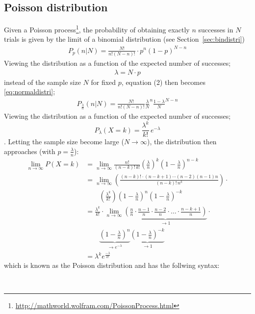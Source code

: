 \documentclass[fontsize=11pt,english,BCOR=10mm,DIV=12,bibliography=totoc,parskip=false,headings=small,
    headinclude=false,footinclude=false,oneside]{pst-doc}
\begin{document}
\clearpage
\subsection{Poisson distribution}
Given a Poisson process\footnote{\url{http://mathworld.wolfram.com/PoissonProcess.html}}, 
the probability of obtaining exactly $n$ successes in $N$ trials is given by the 
limit of a binomial distribution (see Section~\ref{sec:bindistri})
%
\begin{align}
P_p(n|N) = \frac{N!}{n!(N-n)!}\cdot p^n(1-p)^{N-n}\label{eq:normaldistri}
\end{align}
%
Viewing the distribution as a function of the expected number of successes;
%	
\begin{align}\label{eq:nu}
\lambda = N\cdot p
\end{align}
%
instead of the sample size $N$ for fixed $p$, equation (2) then becomes
\eqref{eq:normaldistri};
%	
\begin{align}\label{eq:nuN}
P_{\frac{\lambda}{n}}(n|N) = \frac{N!}{n!(N-n)!}{\frac{\lambda}{N}}^n {\frac{1-\lambda}{N}}^{N-n}
\end{align}
%
Viewing the distribution as a function of the expected number of successes;
%
\[ P_\lambda(X=k)=\frac{\lambda^k}{k!}\,e^{-\lambda} \].
%
Letting the sample size become large ($N\to\infty$), the distribution then 
approaches (with $p=\frac{\lambda}{n}$):
%
\begin{align}
\lim_{n\to\infty} P(X=k) &= \lim_{n\to\infty}\frac{n!}{(n-k)!\,k!}
	 \left(\frac{\lambda}{n}\right)^k \left(1-\frac{\lambda}{n}\right)^{n-k} \\
  &= \lim_{n\to\infty} \left(\frac{(n-k)!\cdot (n-k+1)\cdots(n-2)(n-1)n}{(n-k)!\,n^k}\right)\cdot\\
  &\qquad \left(\frac{\lambda^k}{k!}\right)\left(1-\frac{\lambda}{n}\right)^n 
	\left(1-\frac{\lambda}{n}\right)^{-k}\\
  &= \frac{\lambda^k}{k!}\cdot \lim_{n\to\infty}
     \underbrace{\left(\frac{n}{n}\cdot \frac{n-1}{n}\cdot\frac{n-2}{n}\cdot\ldots\cdot 
    	\frac{n-k+1}{n}\right)}_{\to 1} \cdot\\
  &\qquad   \underbrace{\left(1-\frac{\lambda}{n}\right)^n}_{\to{e^{-\lambda}}}  
     \underbrace{\left(1-\frac{\lambda}{n}\right)^{-k}}_{\to 1}\\
  &=  \lambda^k e^{\frac{-\lambda}{k!}}
\end{align}
%
which is known as the Poisson distribution and has the follwing syntax:

\begin{BDef}
\OptArgs{}\\
\OptArgs{}
\end{BDef}
\end{document}
